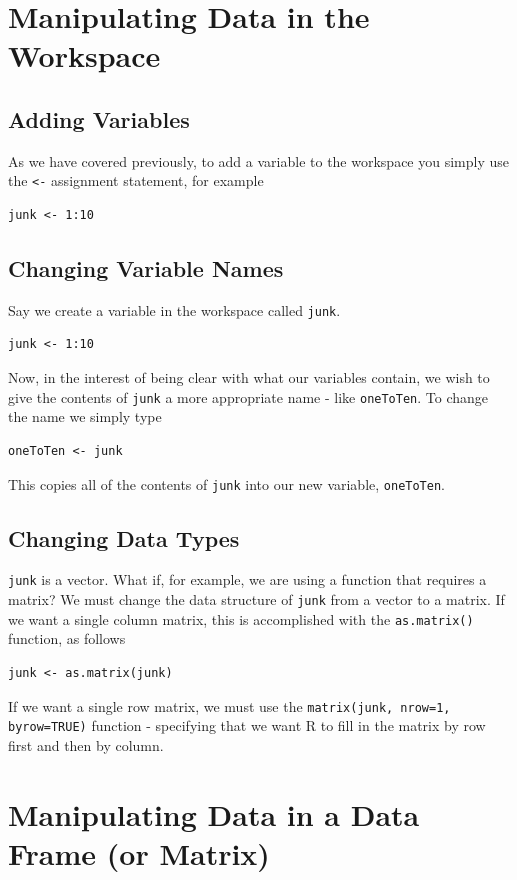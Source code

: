 \documentclass[11pt,letterpaper,fleqn]{report}
\begin{document}
\section{Manipulating Data in the Workspace}
\subsection{Adding Variables}
As we have covered previously, to add a variable to the workspace you simply use the \texttt{<-} assignment statement, for example
\begin{verbatim}
junk <- 1:10
\end{verbatim}
\subsection{Changing Variable Names}
Say we create a variable in the workspace called \texttt{junk}.
\begin{verbatim}
junk <- 1:10
\end{verbatim}
Now, in the interest of being clear with what our variables contain, we wish to give the contents of \texttt{junk} a more appropriate name - like \texttt{oneToTen}. To change the name we simply type
\begin{verbatim}
oneToTen <- junk
\end{verbatim}
This copies all of the contents of \texttt{junk} into our new variable, \texttt{oneToTen}.
\subsection{Changing Data Types}
\texttt{junk} is a vector. What if, for example, we are using a function that requires a matrix? We must change the data structure of \texttt{junk} from a vector to a matrix. If we want a single column matrix, this is accomplished with the \texttt{as.matrix()} function, as follows
\begin{verbatim}
junk <- as.matrix(junk)
\end{verbatim}
If we want a single row matrix, we must use the \texttt{matrix(junk, nrow=1, byrow=TRUE)} function - specifying that we want R to fill in the matrix by row first and then by column.
\section{Manipulating Data in a Data Frame (or Matrix)}
\end{document}
